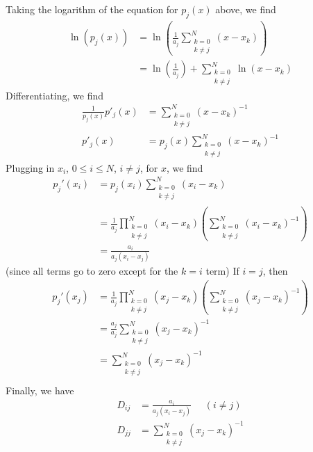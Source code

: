 \documentclass{article}
\begin{document}
Taking the logarithm of the equation for $p_j(x)$ above, we find
\begin{align*}
    \ln{(p_j(x))} &= \ln{\left(\frac{1}{a_j}\sum_{\substack{k=0\\ k\neq j}}^N (x -x_k)\right)}\\
    &= \ln{\left(\frac{1}{a_j}\right)} + \sum_{\substack{k=0\\ k\neq j}}^N \ln{(x - x_k)}
\end{align*}
Differentiating, we find 
\begin{align*}
    \frac{1}{p_j(x)}p'_j(x) &= \sum_{\substack{k = 0\\ k\neq j}}^N (x-x_k)^{-1}\\
    p'_j(x) &= p_j(x)\sum_{\substack{k=0\\k\neq j}}^N (x-x_k)^{-1}
\end{align*}
Plugging in $x_i$, $0 \leq i \leq N$, $i \neq j$, for $x$, we find
\begin{align*}
    p_j'(x_i) &= p_j(x_i)\sum_{\substack{k=0\\k\neq j}}^N(x_i - x_k)\\
    &= \frac{1}{a_j}\prod_{\substack{k = 0\\ k \neq j}}^N(x_i-x_k)\left(\sum_{\substack{k=0\\k\neq j}}^N(x_i - x_k)^{-1}\right)\\
    &= \frac{a_i}{a_j(x_i - x_j)}
\end{align*}
(since all terms go to zero except for the $k=i$ term)\newline
If $i = j$, then
\begin{align*}
    p_j'(x_j) &= \frac{1}{a_j}\prod_{\substack{k=0\\k\neq j}}^N(x_j - x_k) \left(\sum_{\substack{k=0\\k \neq j}}^N(x_j - x_k)^{-1}\right)\\
    &= \frac{a_j}{a_j}\sum_{\substack{k=0\\k\neq j}}^N(x_j - x_k)^{-1}\\
    &= \sum_{\substack{k=0 \\k\neq j}}^N(x_j - x_k)^{-1}\\
\end{align*}
Finally, we have 
\begin{align*}
    D_{ij} &= \frac{a_i}{a_j(x_i - x_j)} \:\:\:\:\:\: (i \neq j)\\
    D_{jj} &= \sum_{\substack{k= 0\\k \neq j}}^N(x_j - x_k)^{-1}
\end{align*}
\end{document}

